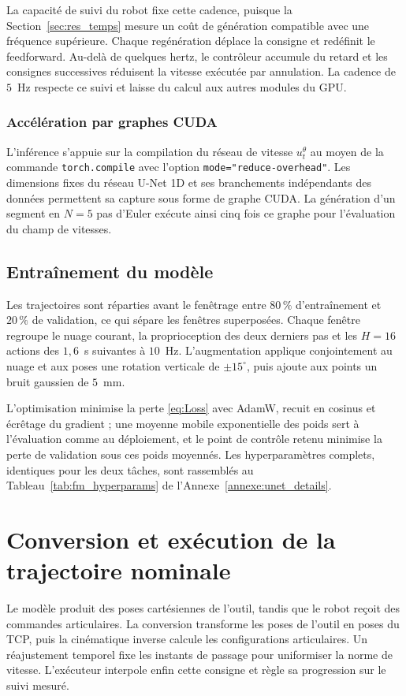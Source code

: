 La capacité de suivi du robot fixe cette cadence, puisque la Section~\ref{sec:res_temps} mesure un coût de génération compatible avec une fréquence supérieure. Chaque regénération déplace la consigne et redéfinit le feedforward. Au-delà de quelques hertz, le contrôleur accumule du retard et les consignes successives réduisent la vitesse exécutée par annulation. La cadence de $5$~Hz respecte ce suivi et laisse du calcul aux autres modules du \ac{GPU}.

\subsubsection{Accélération par graphes CUDA}
L'inférence s'appuie sur la compilation du réseau de vitesse $u_t^{\theta}$ au moyen de la commande \texttt{torch.compile} avec l'option \texttt{mode="reduce-overhead"}. Les dimensions fixes du réseau U-Net 1D et ses branchements indépendants des données permettent sa capture sous forme de graphe CUDA. La génération d'un segment en $N=5$ pas d'Euler exécute ainsi cinq fois ce graphe pour l'évaluation du champ de vitesses.


\subsection{Entraînement du modèle}

Les trajectoires sont réparties avant le fenêtrage entre $80\,\%$ d'entraînement et $20\,\%$ de validation, ce qui sépare les fenêtres superposées. Chaque fenêtre regroupe le nuage courant, la proprioception des deux derniers pas et les $H=16$ actions des $1{,}6$~s suivantes à $10$~Hz. L'augmentation applique conjointement au nuage et aux poses une rotation verticale de $\pm15^{\circ}$, puis ajoute aux points un bruit gaussien de $5$~mm.

L'optimisation minimise la perte \eqref{eq:Loss} avec AdamW, recuit en cosinus et écrêtage du gradient ; une moyenne mobile exponentielle des poids sert à l'évaluation comme au déploiement, et le point de contrôle retenu minimise la perte de validation sous ces poids moyennés. Les hyperparamètres complets, identiques pour les deux tâches, sont rassemblés au Tableau~\ref{tab:fm_hyperparams} de l'Annexe~\ref{annexe:unet_details}.


\section{Conversion et exécution de la trajectoire nominale} \label{sec:Conversion}
Le modèle produit des poses cartésiennes de l'outil, tandis que le robot reçoit des commandes articulaires. La conversion transforme les poses de l'outil en poses du \ac{TCP}, puis la cinématique inverse calcule les configurations articulaires. Un réajustement temporel fixe les instants de passage pour uniformiser la norme de vitesse. L'exécuteur interpole enfin cette consigne et règle sa progression sur le suivi mesuré.

